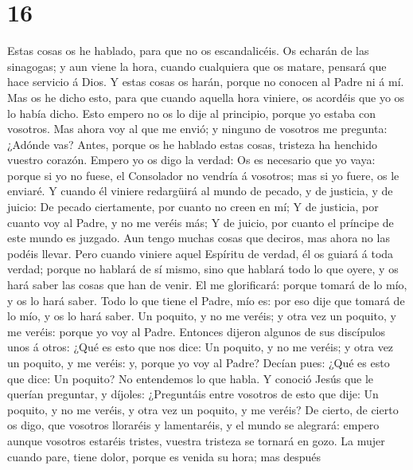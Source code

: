 \hypertarget{section-15}{%
\section{16}\label{section-15}}

 Estas cosas os he hablado, para que no os escandalicéis.
 Os echarán de las sinagogas; y aun viene la hora, cuando
cualquiera que os matare, pensará que hace servicio á Dios. 
Y estas cosas os harán, porque no conocen al Padre ni á mí. 
Mas os he dicho esto, para que cuando aquella hora viniere, os acordéis
que yo os lo había dicho. Esto empero no os lo dije al principio, porque
yo estaba con vosotros.  Mas ahora voy al que me envió; y
ninguno de vosotros me pregunta: ¿Adónde vas?  Antes, porque
os he hablado estas cosas, tristeza ha henchido vuestro corazón.
 Empero yo os digo la verdad: Os es necesario que yo vaya:
porque si yo no fuese, el Consolador no vendría á vosotros; mas si yo
fuere, os le enviaré.  Y cuando él viniere redargüirá al
mundo de pecado, y de justicia, y de juicio:  De pecado
ciertamente, por cuanto no creen en mí;  Y de justicia, por
cuanto voy al Padre, y no me veréis más;  Y de juicio, por
cuanto el príncipe de este mundo es juzgado.  Aun tengo
muchas cosas que deciros, mas ahora no las podéis llevar. 
Pero cuando viniere aquel Espíritu de verdad, él os guiará á toda
verdad; porque no hablará de sí mismo, sino que hablará todo lo que
oyere, y os hará saber las cosas que han de venir.  El me
glorificará: porque tomará de lo mío, y os lo hará saber. 
Todo lo que tiene el Padre, mío es: por eso dije que tomará de lo mío, y
os lo hará saber.  Un poquito, y no me veréis; y otra vez
un poquito, y me veréis: porque yo voy al Padre.  Entonces
dijeron algunos de sus discípulos unos á otros: ¿Qué es esto que nos
dice: Un poquito, y no me veréis; y otra vez un poquito, y me veréis: y,
porque yo voy al Padre?  Decían pues: ¿Qué es esto que
dice: Un poquito? No entendemos lo que habla.  Y conoció
Jesús que le querían preguntar, y díjoles: ¿Preguntáis entre vosotros de
esto que dije: Un poquito, y no me veréis, y otra vez un poquito, y me
veréis?  De cierto, de cierto os digo, que vosotros
lloraréis y lamentaréis, y el mundo se alegrará: empero aunque vosotros
estaréis tristes, vuestra tristeza se tornará en gozo.  La
mujer cuando pare, tiene dolor, porque es venida su hora; mas después
